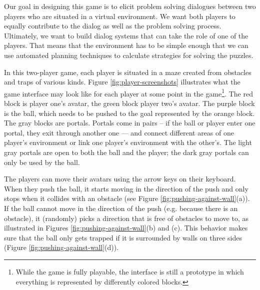 Our goal in designing this game is to elicit problem solving
dialogues between two players who are situated in a virtual
environment. We want both players to equally contribute to the dialog
as well as the problem solving process.  Ultimately, we want to build
dialog systems that can take the role of one of the players. That
means that the environment has to be simple enough that we can use
automated planning techniques to calculate strategies for solving the
puzzles.

In this two-player game, each player is situated in a maze created
from obstacles and traps of various kinds.  Figure
\ref{fig:player-screenshots} illustrates what the game interface may
look like for each player at some point in the
game\footnote{While the game is fully playable, the interface is still
  a prototype in which everything is represented by differently
  colored blocks.}. The red block is player one's avatar, the green
block player two's avatar. The purple block is the ball, which needs
to be pushed to the goal represented by the orange block. The 
gray blocks are portals. Portals come in pairs -- if the ball or
player enter one portal, they exit through another one --- and connect
different areas of one player's environment or link one player's
environment with the other's. The light gray portals are open to both the
ball and the player; the dark gray portals can only be used by the ball.



The players can move their avatars using the arrow keys on their
keyboard. When they push the ball, it starts moving in the direction
of the push and only stops when it collides with an obstacle (see
Figure \ref{fig:pushing-against-wall}(a)). If the
ball cannot move in the direction of the push (e.g. because there is
an obstacle), it (randomly) picks a direction that is free of
obstacles to move to, as illustrated in Figures
\ref{fig:pushing-against-wall}(b) and (c). This behavior makes sure
that the ball only gets trapped if it is surrounded by walls on three
sides (Figure \ref{fig:pushing-against-wall}(d)).

